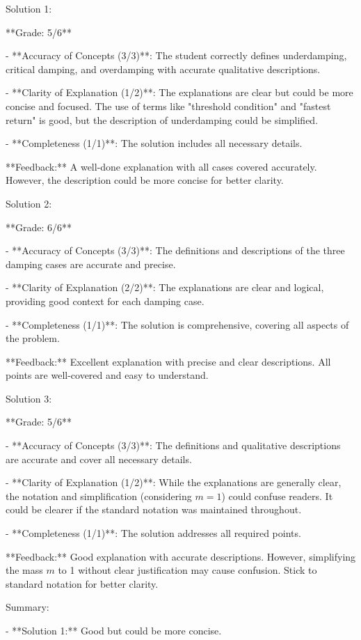 \documentclass[a4paper,11pt]{article}
\begin{document}
Solution 1:

**Grade: 5/6**

- **Accuracy of Concepts (3/3)**: The student correctly defines underdamping, critical damping, and overdamping with accurate qualitative descriptions.

- **Clarity of Explanation (1/2)**: The explanations are clear but could be more concise and focused. The use of terms like "threshold condition" and "fastest return" is good, but the description of underdamping could be simplified.

- **Completeness (1/1)**: The solution includes all necessary details.

**Feedback:** A well-done explanation with all cases covered accurately. However, the description could be more concise for better clarity.

Solution 2:

**Grade: 6/6**

- **Accuracy of Concepts (3/3)**: The definitions and descriptions of the three damping cases are accurate and precise.

- **Clarity of Explanation (2/2)**: The explanations are clear and logical, providing good context for each damping case.

- **Completeness (1/1)**: The solution is comprehensive, covering all aspects of the problem.

**Feedback:** Excellent explanation with precise and clear descriptions. All points are well-covered and easy to understand.

Solution 3:

**Grade: 5/6**

- **Accuracy of Concepts (3/3)**: The definitions and qualitative descriptions are accurate and cover all necessary details.

- **Clarity of Explanation (1/2)**: While the explanations are generally clear, the notation and simplification (considering \(m=1\)) could confuse readers. It could be clearer if the standard notation was maintained throughout.

- **Completeness (1/1)**: The solution addresses all required points.

**Feedback:** Good explanation with accurate descriptions. However, simplifying the mass \(m\) to 1 without clear justification may cause confusion. Stick to standard notation for better clarity.

Summary:

- **Solution 1:** Good but could be more concise.
\end{document}

